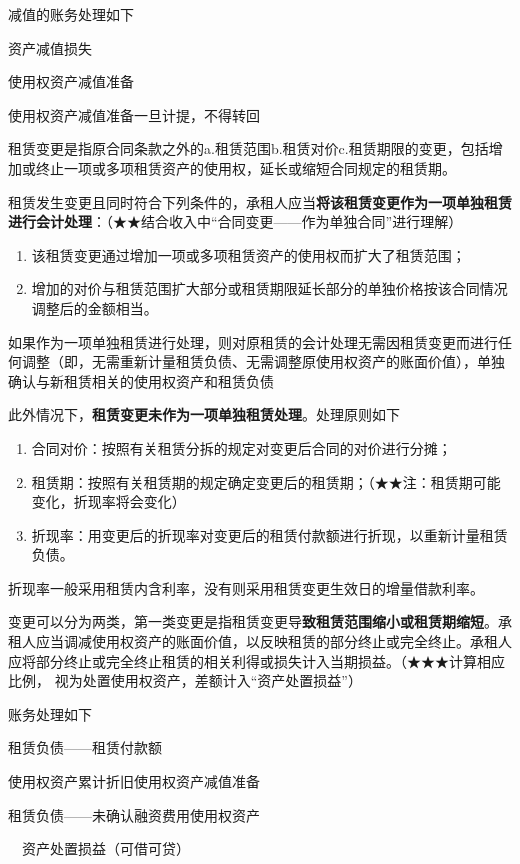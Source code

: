 \documentclass[UTF8,12pt]{ctexart}
\newenvironment{Dr}{%
	\begin{list}{}%
		{
			\setlength{\leftmargin}{2em}
			\setlength{\labelwidth}{2em}
			\setlength{\labelsep}{0pt}
			\setlength{\itemindent}{0pt}
			\setlength{\listparindent}{0pt}
			\setlength{\parsep}{0pt}
			\setlength{\topsep}{0pt}
		}
		\item[\textbf{借：}]
	}{%
	\end{list}
}
\newenvironment{Cr}{%
	\begin{list}{}%
		{
			\setlength{\leftmargin}{2em}
			\setlength{\labelwidth}{2em}
			\setlength{\labelsep}{0pt}
			\setlength{\itemindent}{0pt}
			\setlength{\listparindent}{0pt}
			\setlength{\parsep}{0pt}
			\setlength{\topsep}{0pt}
		}
		\item[\textbf{贷：}]
	}{%
	\end{list}
}
\numberwithin{equation}{section} %
\numberwithin{figure}{section}
\numberwithin{table}{section}
\begin{document}
	减值的账务处理如下
	
	\begin{Dr}
		资产减值损失
	\end{Dr}
	\begin{Cr}
		使用权资产减值准备
	\end{Cr}
	使用权资产减值准备一旦计提，不得转回
	
	租赁变更是指原合同条款之外的a.租赁范围b.租赁对价c.租赁期限的变更，包括增加或终止一项或多项租赁资产的使用权，延长或缩短合同规定的租赁期。
	
	租赁发生变更且同时符合下列条件的，承租人应当\textbf{将该租赁变更作为一项单独租赁进行会计处理}：（★★结合收入中“合同变更——作为单独合同”进行理解）
	\begin{enumerate}
		\item 该租赁变更通过增加一项或多项租赁资产的使用权而扩大了租赁范围；
		
		\item 增加的对价与租赁范围扩大部分或租赁期限延长部分的单独价格按该合同情况调整后的金额相当。
	\end{enumerate}

	如果作为一项单独租赁进行处理，则对原租赁的会计处理无需因租赁变更而进行任何调整（即，无需重新计量租赁负债、无需调整原使用权资产的账面价值），单独确认与新租赁相关的使用权资产和租赁负债
	
	此外情况下，\textbf{租赁变更未作为一项单独租赁处理}。处理原则如下
	\begin{enumerate}
		\item 合同对价：按照有关租赁分拆的规定对变更后合同的对价进行分摊；
		
		\item 租赁期：按照有关租赁期的规定确定变更后的租赁期；（★★注：租赁期可能变化，折现率将会变化）
		
		\item 折现率：用变更后的折现率对变更后的租赁付款额进行折现，以重新计量租赁负债。
	\end{enumerate}
	折现率一般采用租赁内含利率，没有则采用租赁变更生效日的增量借款利率。
	
	变更可以分为两类，第一类变更是指租赁变更导\textbf{致租赁范围缩小或租赁期缩短}。承租人应当调减使用权资产的账面价值，以反映租赁的部分终止或完全终止。承租人应将部分终止或完全终止租赁的相关利得或损失计入当期损益。（★★★计算相应比例， 视为处置使用权资产，差额计入“资产处置损益”）
	
	账务处理如下
	
	\begin{Dr}
		租赁负债——租赁付款额
		
		使用权资产累计折旧使用权资产减值准备
	\end{Dr}
	\begin{Cr}
		租赁负债——未确认融资费用使用权资产
		
		\ \ 资产处置损益（可借可贷）
	\end{Cr}
	
\end{document}
